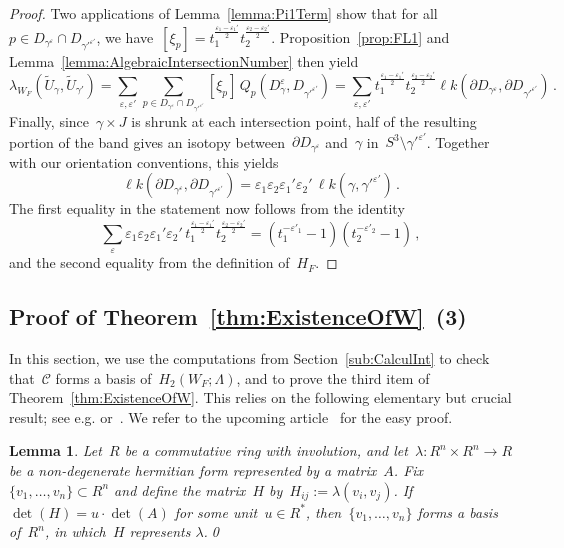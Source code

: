 \documentclass[10.9pt,a4paper]{amsart}
\newtheorem{lemma}[theorem]{Lemma}
\theoremstyle{definition}
\theoremstyle{remark}
\newcommand{\lk}{\ell k}
\begin{document}
\begin{proof}
Two applications of Lemma~\ref{lemma:Pi1Term} show that for all~$p\in D_{\gamma^\varepsilon} \cap D_{\gamma'^{\varepsilon'}}$, we have~$[\xi_p] = t_1^{\frac{\varepsilon_1 - \varepsilon_1'}{2}} t_2^{\frac{\varepsilon_2 - \varepsilon_2'}{2}}$.
Proposition~\ref{prop:FL1} and Lemma~\ref{lemma:AlgebraicIntersectionNumber} then yield
\[
\lambda_{W_F}(\tilde U_{\gamma},\tilde U_{\gamma'}) = \sum_{\varepsilon,\varepsilon'} \sum_{p \in D_{\gamma^\varepsilon} \cap D_{\gamma'^{\varepsilon'}}} [\xi_p] \,Q_p(D_{\gamma}^\varepsilon, D_{\gamma'^{\varepsilon'}})
=\sum_{\varepsilon,\varepsilon'}t_1^{\frac{\varepsilon_1 - \varepsilon_1'}{2}} t_2^{\frac{\varepsilon_2 - \varepsilon_2'}{2}}\lk(\partial D_{\gamma^\varepsilon},\partial D_{\gamma'^{\varepsilon'}})\,.
\]
Finally, since~$\gamma \times J$ is shrunk at each intersection point, half of the resulting portion of the band gives an isotopy between~$\partial D_{\gamma^\varepsilon}$ and~$\gamma$ in~$S^3 \setminus \gamma'^{\varepsilon'}$. Together with our orientation conventions, this yields
\[
\lk(\partial D_{\gamma^\varepsilon},\partial D_{\gamma'^{\varepsilon'}}) = \varepsilon_1\varepsilon_2\varepsilon_1'\varepsilon_2' \, \lk(\gamma,\gamma'^{\varepsilon'})\,.
\]
The first equality in the statement now follows from the identity
\[
\sum_{\varepsilon} \varepsilon_1\varepsilon_2 \varepsilon_1'\varepsilon_2'\, t_1^{\frac{\varepsilon_1 - \varepsilon_1'}{2}} t_2^{\frac{\varepsilon_2 - \varepsilon_2'}{2}}=(t_1^{-\varepsilon'_1}-1)(t_2^{-\varepsilon'_2}-1)\,,
\]
and the second equality from the definition of~$H_F$.
\end{proof}









\subsection{Proof of Theorem~\ref{thm:ExistenceOfW}~(3)}
\label{sub:EquivIntForm}

In this section, we use the computations from Section~\ref{sub:CalculInt} to check that~$\mathcal{C}$ forms a basis of~$H_2(W_F;\Lambda)$, and to prove the third item of Theorem~\ref{thm:ExistenceOfW}.
This relies on the following elementary but crucial result; see e.g.\cite[Lemma 2.4]{JuhaszPowell} or~\cite{FL26}.
We refer to the upcoming article~\cite{FL26} for the easy proof.

\begin{lemma}
\label{lemma:FL2}
Let~$R$ be a commutative ring with involution, and let~$\lambda \colon R^n \times R^n \to R$ be a non-degenerate hermitian form represented by a matrix~$A$. Fix~$\{v_1, \ldots, v_n\} \subset R^n$ and define the matrix~$H$ by~$H_{ij} := \lambda(v_i,v_j)$. If~$\det(H) = u \cdot \det(A)$ for some unit~$u \in R^*$, then~$\{v_1, \ldots, v_n\}$ forms a basis of~$R^n$, in which~$H$ represents $\lambda$.\qed
\end{lemma}
\end{document}

